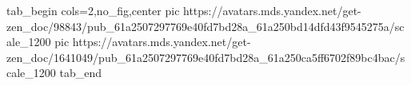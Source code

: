  
 
 
 
 


\ifcmt
  tab_begin cols=2,no_fig,center
     pic https://avatars.mds.yandex.net/get-zen_doc/98843/pub_61a2507297769e40fd7bd28a_61a250bd14dfd43f9545275a/scale_1200
		 pic https://avatars.mds.yandex.net/get-zen_doc/1641049/pub_61a2507297769e40fd7bd28a_61a250ca5ff6702f89bc4bac/scale_1200
  tab_end
\fi
